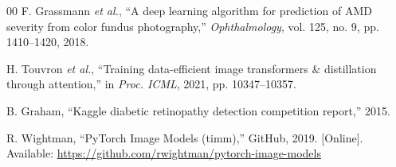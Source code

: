 \documentclass[conference]{IEEEtran}
\begin{document}
\begin{thebibliography}{00}
F. Grassmann \textit{et al.}, ``A deep learning algorithm for prediction of AMD severity from color fundus photography,'' \textit{Ophthalmology}, vol. 125, no. 9, pp. 1410--1420, 2018.

H. Touvron \textit{et al.}, ``Training data-efficient image transformers \& distillation through attention,'' in \textit{Proc. ICML}, 2021, pp. 10347--10357.

B. Graham, ``Kaggle diabetic retinopathy detection competition report,'' 2015.

R. Wightman, ``PyTorch Image Models (timm),'' GitHub, 2019. [Online]. Available: \url{https://github.com/rwightman/pytorch-image-models}

\end{thebibliography}
\end{document}
